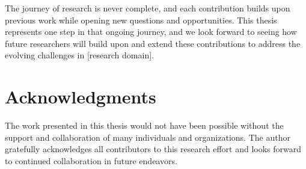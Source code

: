 The journey of research is never complete, and each contribution builds upon previous work while opening new questions and opportunities. This thesis represents one step in that ongoing journey, and we look forward to seeing how future researchers will build upon and extend these contributions to address the evolving challenges in [research domain].

\section*{Acknowledgments}

The work presented in this thesis would not have been possible without the support and collaboration of many individuals and organizations. The author gratefully acknowledges all contributors to this research effort and looks forward to continued collaboration in future endeavors.